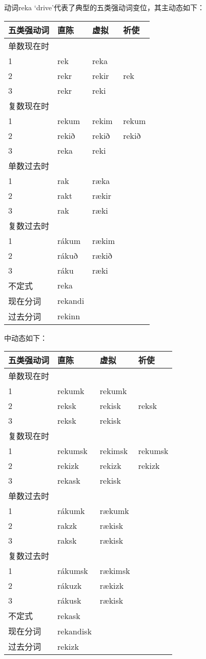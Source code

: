 动词reka `drive‌'代表了典型的五类强动词变位，其主动态如下：

\begin{longtable}{llll}
\toprule
五类强动词 & 直陈 & 虚拟 & 祈使 \\
\midrule
\endhead
\bottomrule
\endfoot
单数现在时 & & & \\
1 & rek & reka & \\
2 & rekr & rekir & rek \\
3 & rekr & reki & \\
复数现在时 & & & \\
1 & rekum & rekim & rekum \\
2 & rekið & rekið & rekið \\
3 & reka & reki & \\
单数过去时 & & & \\
1 & rak & ræka & \\
2 & rakt & rækir & \\
3 & rak & ræki & \\
复数过去时 & & & \\
1 & rákum & rækim & \\
2 & rákuð & rækið & \\
3 & ráku & ræki & \\
不定式 & reka & & \\
现在分词 & rekandi & & \\
过去分词 & rekinn & & \\
\end{longtable}

中动态如下：

\begin{longtable}{llll}
\toprule
五类强动词 & 直陈 & 虚拟 & 祈使 \\
\midrule
\endhead
\bottomrule
\endfoot
单数现在时 & & & \\
1 & rekumk & rekumk & \\
2 & reksk & rekisk & reksk \\
3 & reksk & rekisk & \\
复数现在时 & & & \\
1 & rekumsk & rekimsk & rekumsk \\
2 & rekizk & rekizk & rekizk \\
3 & rekask & rekisk & \\
单数过去时 & & & \\
1 & rákumk & rækumk & \\
2 & rakzk & rækisk & \\
3 & raksk & rækisk & \\
复数过去时 & & & \\
1 & rákumsk & rækimsk & \\
2 & rákuzk & rækizk & \\
3 & rákusk & rækisk & \\
不定式 & rekask & & \\
现在分词 & rekandisk & & \\
过去分词 & rekizk & & \\
\end{longtable}

